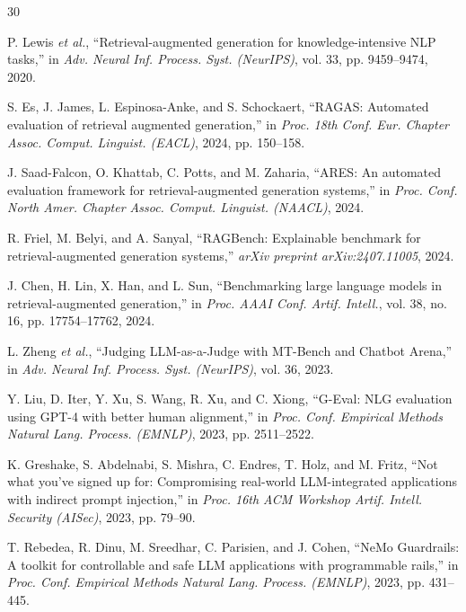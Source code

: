 \documentclass[conference]{IEEEtran}
\begin{document}
\begin{thebibliography}{30}

P. Lewis \emph{et al.}, ``Retrieval-augmented generation for knowledge-intensive NLP tasks,'' in \emph{Adv. Neural Inf. Process. Syst. (NeurIPS)}, vol. 33, pp. 9459--9474, 2020.

S. Es, J. James, L. Espinosa-Anke, and S. Schockaert, ``RAGAS: Automated evaluation of retrieval augmented generation,'' in \emph{Proc. 18th Conf. Eur. Chapter Assoc. Comput. Linguist. (EACL)}, 2024, pp. 150--158.

J. Saad-Falcon, O. Khattab, C. Potts, and M. Zaharia, ``ARES: An automated evaluation framework for retrieval-augmented generation systems,'' in \emph{Proc. Conf. North Amer. Chapter Assoc. Comput. Linguist. (NAACL)}, 2024.

R. Friel, M. Belyi, and A. Sanyal, ``RAGBench: Explainable benchmark for retrieval-augmented generation systems,'' \emph{arXiv preprint arXiv:2407.11005}, 2024.

J. Chen, H. Lin, X. Han, and L. Sun, ``Benchmarking large language models in retrieval-augmented generation,'' in \emph{Proc. AAAI Conf. Artif. Intell.}, vol. 38, no. 16, pp. 17754--17762, 2024.

L. Zheng \emph{et al.}, ``Judging LLM-as-a-Judge with MT-Bench and Chatbot Arena,'' in \emph{Adv. Neural Inf. Process. Syst. (NeurIPS)}, vol. 36, 2023.

Y. Liu, D. Iter, Y. Xu, S. Wang, R. Xu, and C. Xiong, ``G-Eval: NLG evaluation using GPT-4 with better human alignment,'' in \emph{Proc. Conf. Empirical Methods Natural Lang. Process. (EMNLP)}, 2023, pp. 2511--2522.

K. Greshake, S. Abdelnabi, S. Mishra, C. Endres, T. Holz, and M. Fritz, ``Not what you've signed up for: Compromising real-world LLM-integrated applications with indirect prompt injection,'' in \emph{Proc. 16th ACM Workshop Artif. Intell. Security (AISec)}, 2023, pp. 79--90.

T. Rebedea, R. Dinu, M. Sreedhar, C. Parisien, and J. Cohen, ``NeMo Guardrails: A toolkit for controllable and safe LLM applications with programmable rails,'' in \emph{Proc. Conf. Empirical Methods Natural Lang. Process. (EMNLP)}, 2023, pp. 431--445.


\end{thebibliography}
\end{document}

